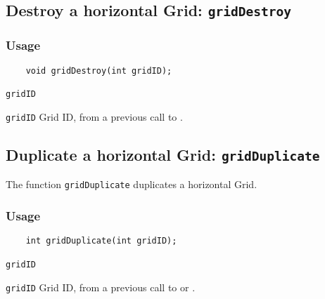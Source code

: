 \subsection{Destroy a horizontal Grid: \texttt{gridDestroy}}
\label{gridDestroy}
\subsubsection*{Usage}

\begin{verbatim}
    void gridDestroy(int gridID);
\end{verbatim}

\hspace*{4mm}\begin{minipage}[]{15cm}
\begin{deflist}{\texttt{gridID}\ }
\item[\texttt{gridID}]
Grid ID, from a previous call to {}.

\end{deflist}
\end{minipage}


\subsection{Duplicate a horizontal Grid: \texttt{gridDuplicate}}
\label{gridDuplicate}

The function {\texttt{gridDuplicate}} duplicates a horizontal Grid.

\subsubsection*{Usage}

\begin{verbatim}
    int gridDuplicate(int gridID);
\end{verbatim}

\hspace*{4mm}\begin{minipage}[]{15cm}
\begin{deflist}{\texttt{gridID}\ }
\item[\texttt{gridID}]
Grid ID, from a previous call to {} or {}.

\end{deflist}
\end{minipage}


